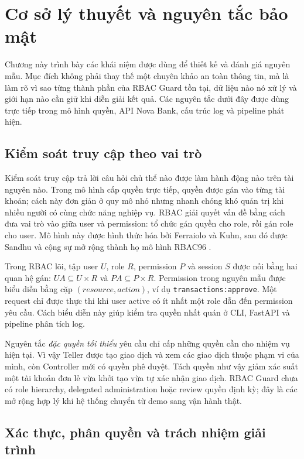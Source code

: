 \chapter{Cơ sở lý thuyết và nguyên tắc bảo mật}
\label{chap:foundations}

Chương này trình bày các khái niệm được dùng để thiết kế và đánh giá nguyên
mẫu. Mục đích không phải thay thế một chuyên khảo an toàn thông tin, mà là làm
rõ vì sao từng thành phần của RBAC Guard tồn tại, dữ liệu nào nó xử lý và giới
hạn nào cần giữ khi diễn giải kết quả. Các nguyên tắc dưới đây được dùng trực
tiếp trong mô hình quyền, API Nova Bank, cấu trúc log và pipeline phát hiện.

\section{Kiểm soát truy cập theo vai trò}

Kiểm soát truy cập trả lời câu hỏi chủ thể nào được làm hành động nào trên tài
nguyên nào. Trong mô hình cấp quyền trực tiếp, quyền được gán vào từng tài khoản;
cách này đơn giản ở quy mô nhỏ nhưng nhanh chóng khó quản trị khi nhiều người có
cùng chức năng nghiệp vụ. RBAC giải quyết vấn đề bằng cách đưa vai trò vào giữa
user và permission: tổ chức gán quyền cho role, rồi gán role cho user. Mô hình
này được hình thức hóa bởi Ferraiolo và Kuhn, sau đó được Sandhu và cộng sự mở
rộng thành họ mô hình RBAC96 \citep{Ferraiolo1992RBAC,Sandhu1996RBAC}.

Trong RBAC lõi, tập user $U$, role $R$, permission $P$ và session $S$ được nối
bằng hai quan hệ gán: $UA \subseteq U \times R$ và $PA \subseteq P \times R$.
Permission trong nguyên mẫu được biểu diễn bằng cặp $(resource, action)$, ví
dụ \texttt{transactions:approve}. Một request chỉ được thực thi khi user active
có ít nhất một role dẫn đến permission yêu cầu. Cách biểu diễn này giúp kiểm
tra quyền nhất quán ở CLI, FastAPI và pipeline phân tích log.

Nguyên tắc \emph{đặc quyền tối thiểu} yêu cầu chỉ cấp những quyền cần cho nhiệm
vụ hiện tại. Vì vậy Teller được tạo giao dịch và xem các giao dịch thuộc phạm
vi của mình, còn Controller mới có quyền phê duyệt. Tách quyền như vậy giảm
xác suất một tài khoản đơn lẻ vừa khởi tạo vừa tự xác nhận giao dịch. RBAC Guard
chưa có role hierarchy, delegated administration hoặc review quyền định kỳ;
đây là các mở rộng hợp lý khi hệ thống chuyển từ demo sang vận hành thật.

\section{Xác thực, phân quyền và trách nhiệm giải trình}

